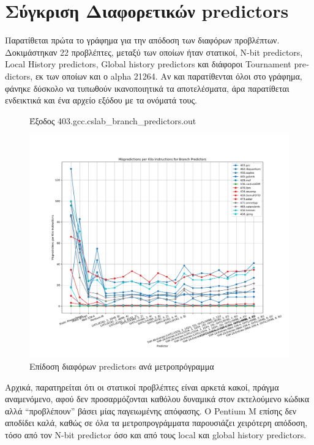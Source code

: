 \documentclass{article}
\newcommand{\eng}[1]{\foreignlanguage{english}{#1}}
\begin{document}
\clearpage
\section{Σύγκριση Διαφορετικών \eng{predictors}}

Παρατίθεται πρώτα το γράφημα για την απόδοση των διαφόρων προβλέπτων. Δοκιμάστηκαν 22 προβλέπτες, μεταξύ των οποίων ήταν στατικοί, \eng{N-bit predictors}, \eng{Local History predictors}, \eng{Global history predictors} και διάφοροι \eng{Tournament predictors}, εκ των οποίων και ο \eng{alpha 21264}. Αν και παρατίθενται όλοι στο γράφημα, φάνηκε δύσκολο να τυπωθούν ικανοποιητικά τα αποτελέσματα, άρα παρατίθεται ενδεικτικά και ένα αρχείο εξόδου με τα ονόματά τους. 

\begin{figure}[h]
    
    \caption{Έξοδος \eng{403.gcc.cslab\_branch\_predictors.out}}
\end{figure}
\FloatBarrier


\begin{figure}[h]
    \centering
    \includegraphics[width=\textwidth]{./outputs/showdown.png} 
    \caption{Επίδοση διαφόρων \eng{predictors} ανά μετροπρόγραμμα}
    \label{fig:showdown}
\end{figure}
\FloatBarrier

Αρχικά, παρατηρείται ότι οι στατικοί προβλέπτες είναι αρκετά κακοί, πράγμα αναμενόμενο, αφού δεν προσαρμόζονται καθόλου δυναμικά στον εκτελούμενο κώδικα αλλά ``προβλέπουν'' βάσει μίας παγειωμένης απόφασης. Ο \eng{Pentium M} επίσης δεν αποδίδει καλά, καθώς σε όλα τα μετροπρογράμματα παρουσιάζει χειρότερη απόδοση, τόσο από τον \eng{N-bit predictor} όσο και από τους \eng{local} και \eng{global history predictors}.
\end{document}
